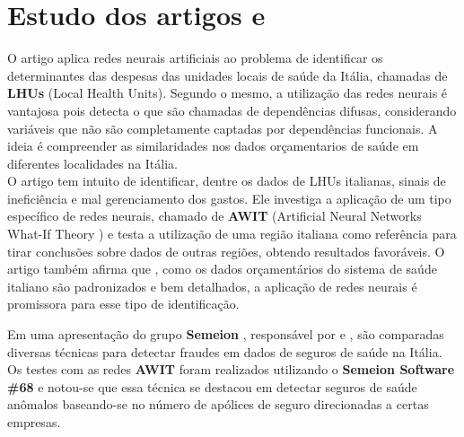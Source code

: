 \documentclass[11pt]{article}
\begin{document}
\section{Estudo dos artigos  \cite{fraudeItalia1} e  \cite{fraudeItalia2}}
O artigo  \cite{fraudeItalia1} aplica redes neurais artificiais ao problema de identificar os determinantes das despesas das unidades locais de saúde da Itália, chamadas de \textbf{LHUs} (Local Health Units). Segundo o mesmo, a utilização das redes neurais é vantajosa pois detecta o que são chamadas de dependências difusas, considerando variáveis que não são completamente captadas por dependências funcionais. A ideia é compreender as similaridades nos dados orçamentarios de saúde em diferentes localidades na Itália.\\

\noindent
O artigo  \cite{fraudeItalia2} tem intuito de identificar, dentre os dados de LHUs italianas, sinais de ineficiência e mal gerenciamento dos gastos. Ele investiga a aplicação de um tipo específico de redes neurais, chamado de \textbf{AWIT} \cite{AWIT}(Artificial Neural Networks What-If Theory ) e testa a utilização de uma região italiana como referência para tirar conclusões sobre dados de outras regiões, obtendo  resultados favoráveis. O artigo também afirma que , como os dados orçamentários do sistema de saúde italiano são padronizados e bem detalhados, a aplicação de redes neurais é promissora para esse tipo de identificação.

Em uma apresentação do grupo \textbf{Semeion} \cite{SEMEION}, responsável por \cite{fraudeItalia1} e  \cite{fraudeItalia2}, são comparadas diversas técnicas para detectar fraudes em dados de seguros de saúde na Itália. Os testes com as redes \textbf{AWIT} foram realizados utilizando o \textbf{Semeion Software \#68} e notou-se que essa técnica se destacou em detectar seguros de saúde anômalos baseando-se no número de apólices de seguro direcionadas a certas empresas.
\end{document}

